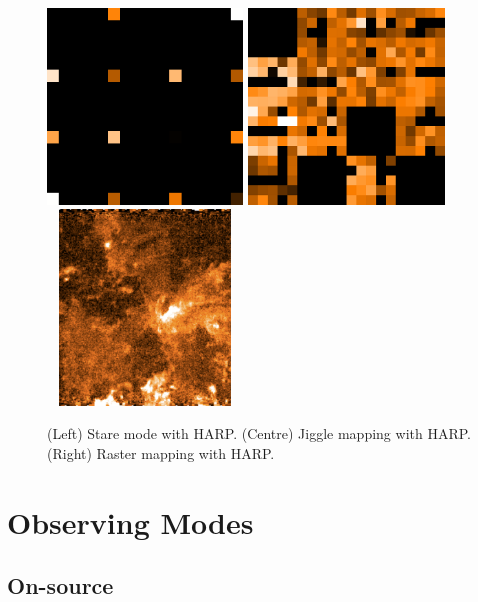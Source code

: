 \documentclass[11pt,oneside,chapters]{starlink}
\begin{document}
\begin{figure}[t!]
\begin{center}
\includegraphics[width=5.2cm, height=5.2cm]{sc20_stare}
\includegraphics[width=5.2cm, height=5.2cm]{sc20_jiggle}
\includegraphics[width=5.2cm, height=5.2cm]{sc20_raster}
\caption[Stare, jiggle and raster observing modes]{(Left) Stare mode
with HARP. (Centre) Jiggle mapping with HARP. (Right) Raster mapping
with HARP.}
\label{fig:harpmodes}
\end{center}
\end{figure}


\section{Observing Modes}
\label{sec:obsmodes}

\subsection{On-source}
\end{document}
